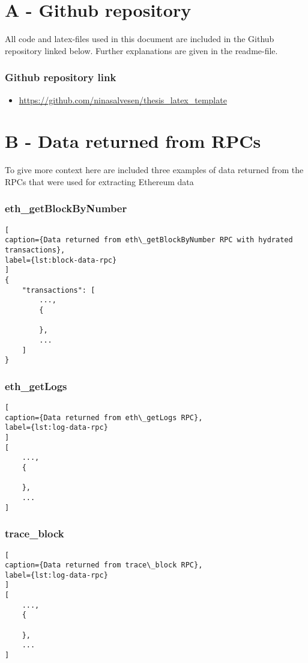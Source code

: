 

\chapter*{A - Github repository}

All code and latex-files used in this document are included in the Github repository linked below. Further explanations are given in the readme-file. 


\subsection*{Github repository link}
\begin{itemize}
    \item \url{https://github.com/ninasalvesen/thesis_latex_template}
\end{itemize}

\chapter*{B - Data returned from RPCs}

To give more context here are included three examples of data returned from the RPCs that were used for extracting Ethereum data 


\subsection*{eth\_getBlockByNumber}

\begin{lstlisting}[
caption={Data returned from eth\_getBlockByNumber RPC with hydrated transactions},
label={lst:block-data-rpc}
]
{
    "transactions": [
        ...,
        {
        
        },
        ...
    ]
}
\end{lstlisting}

\subsection*{eth\_getLogs}

\begin{lstlisting}[
caption={Data returned from eth\_getLogs RPC},
label={lst:log-data-rpc}
]
[
    ...,
    {
    
    },
    ...
]
\end{lstlisting}

\subsection*{trace\_block}

\begin{lstlisting}[
caption={Data returned from trace\_block RPC},
label={lst:log-data-rpc}
]
[
    ...,
    {
    
    },
    ...
]
\end{lstlisting}